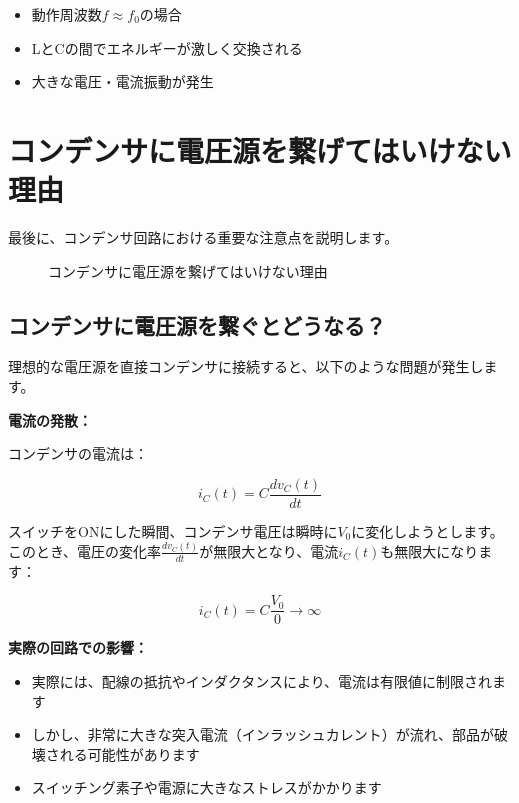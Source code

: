 \begin{itemize}
\item 動作周波数$f \approx f_0$の場合
\item LとCの間でエネルギーが激しく交換される
\item 大きな電圧・電流振動が発生
\end{itemize}

\section{コンデンサに電圧源を繋げてはいけない理由}

最後に、コンデンサ回路における重要な注意点を説明します。

\begin{figure}[H]
\centering
{}
\caption{コンデンサに電圧源を繋げてはいけない理由}
\label{fig:ch04_capacitor_voltage_source}
\end{figure}

\subsection{コンデンサに電圧源を繋ぐとどうなる？}

理想的な電圧源を直接コンデンサに接続すると、以下のような問題が発生します。

\textbf{電流の発散：}

コンデンサの電流は：

\begin{equation}
i_C(t) = C \frac{dv_C(t)}{dt}
\end{equation}

スイッチをONにした瞬間、コンデンサ電圧は瞬時に$V_0$に変化しようとします。このとき、電圧の変化率$\frac{dv_C(t)}{dt}$が無限大となり、電流$i_C(t)$も無限大になります：

\begin{equation}
i_C(t) = C \frac{V_0}{0} \rightarrow \infty
\end{equation}

\textbf{実際の回路での影響：}

\begin{itemize}
\item 実際には、配線の抵抗やインダクタンスにより、電流は有限値に制限されます
\item しかし、非常に大きな突入電流（インラッシュカレント）が流れ、部品が破壊される可能性があります
\item スイッチング素子や電源に大きなストレスがかかります
\end{itemize}

